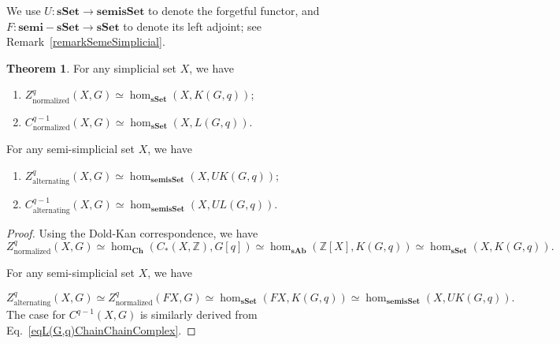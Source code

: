 \documentclass[reprint, amsmath, amssymb, showpacs, floatfix, longbibliography, aps, twocolumn, superscriptaddress, nofootinbib]{revtex4-2}
\newcommand{\ZZ}{{\mathbb Z}}
\theoremstyle{definition}
\newtheorem{theorem}{Theorem}[section]
\begin{document}
We use $U:\mathbf{sSet}\rightarrow \mathbf{semisSet}$ to denote the forgetful functor, and $F:\mathbf{semi-sSet}\rightarrow \mathbf{sSet}$ to denote its left adjoint; see Remark~\ref{remarkSemeSimplicial}.
\begin{theorem}
	For any simplicial set $X$, we have 
		\begin{enumerate}
		\item $Z_{\text{normalized}}^q(X,G)\simeq \hom_{\mathbf{sSet}}(X,K(G,q))$;
		\item $C^{q-1}_\text{normalized}(X,G)\simeq \hom_{\mathbf{sSet}}(X,L(G,q))$.
	\end{enumerate}
	For any semi-simplicial set $X$, we have 
	\begin{enumerate}
		\item $Z_{\text{alternating}}^q(X,G)\simeq \hom_{\mathbf{semisSet}}(X,UK(G,q))$;
		\item $C_{\text{alternating}}^{q-1}(X,G)\simeq \hom_{\mathbf{semisSet}}(X,UL(G,q))$.
	\end{enumerate}
\end{theorem}
\begin{proof}
	Using the Dold-Kan correspondence, we have 
	\begin{equation}
		Z_{\text{normalized}}^q(X,G)\simeq \hom_{\mathbf{Ch}} (C_*(X,\ZZ),G[q])\simeq  \hom_{\mathbf{sAb}}(\ZZ[X],K(G,q))\simeq  \hom_{\mathbf{sSet}}(X,K(G,q)).
	\end{equation}

	
	For any semi-simplicial set $X$, we have
	
	\begin{equation}
		Z_{\text{alternating}}^q(X,G)\simeq Z_{\text{normalized}}^q(FX,G)\simeq \hom_{\mathbf{sSet}}(FX,K(G,q))\simeq \hom_{\mathbf{semisSet}}(X,UK(G,q)).
	\end{equation}
	The case for $C^{q-1}(X,G)$ is similarly derived from Eq.~\eqref{eqL(G,q)ChainChainComplex}.
\end{proof}
\end{document}

